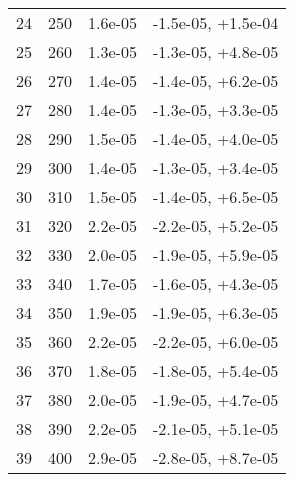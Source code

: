\begin{table}
\begin{adjustbox}{width=1\textwidth/2}
\begin{tabular}{|c|c|c|c|}
\cline{1-4}
24 & 250 & 1.6e-05 & -1.5e-05, +1.5e-04 \\
\cline{1-4}
25 & 260 & 1.3e-05 & -1.3e-05, +4.8e-05 \\
\cline{1-4}
26 & 270 & 1.4e-05 & -1.4e-05, +6.2e-05 \\
\cline{1-4}
27 & 280 & 1.4e-05 & -1.3e-05, +3.3e-05 \\
\cline{1-4}
28 & 290 & 1.5e-05 & -1.4e-05, +4.0e-05 \\
\cline{1-4}
29 & 300 & 1.4e-05 & -1.3e-05, +3.4e-05 \\
\cline{1-4}
30 & 310 & 1.5e-05 & -1.4e-05, +6.5e-05 \\
\cline{1-4}
31 & 320 & 2.2e-05 & -2.2e-05, +5.2e-05 \\
\cline{1-4}
32 & 330 & 2.0e-05 & -1.9e-05, +5.9e-05 \\
\cline{1-4}
33 & 340 & 1.7e-05 & -1.6e-05, +4.3e-05 \\
\cline{1-4}
34 & 350 & 1.9e-05 & -1.9e-05, +6.3e-05 \\
\cline{1-4}
35 & 360 & 2.2e-05 & -2.2e-05, +6.0e-05 \\
\cline{1-4}
36 & 370 & 1.8e-05 & -1.8e-05, +5.4e-05 \\
\cline{1-4}
37 & 380 & 2.0e-05 & -1.9e-05, +4.7e-05 \\
\cline{1-4}
38 & 390 & 2.2e-05 & -2.1e-05, +5.1e-05 \\
\cline{1-4}
39 & 400 & 2.9e-05 & -2.8e-05, +8.7e-05 \\
\cline{1-4}
\end{tabular}
\end{adjustbox}
\end{table}

